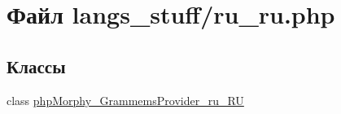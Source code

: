 \hypertarget{ru__ru_8php}{
\section{Файл langs\_\-stuff/ru\_\-ru.php}
\label{ru__ru_8php}
}
\subsection*{Классы}
\begin{DoxyCompactItemize}
\item 
class \hyperlink{classphpMorphy__GrammemsProvider__ru__RU}{phpMorphy\_\-GrammemsProvider\_\-ru\_\-RU}
\end{DoxyCompactItemize}
